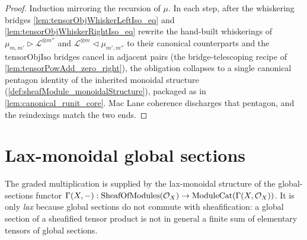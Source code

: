 \begin{proof}
  Induction mirroring the recursion of \(\mu\). In each step, after the whiskering
  bridges \cref{lem:tensorObjWhiskerLeftIso_eq} and
  \cref{lem:tensorObjWhiskerRightIso_eq} rewrite the hand-built whiskerings of
  \(\mu_{m,m'} \rhd \mathcal{L}^{\otimes m''}\) and
  \(\mathcal{L}^{\otimes m} \lhd \mu_{m',m''}\) to their canonical counterparts and
  the \(\mathrm{tensorObjIso}\) bridges cancel in adjacent pairs (the
  bridge-telescoping recipe of \cref{lem:tensorPowAdd_zero_right}), the obligation
  collapses to a single canonical pentagon identity of the inherited monoidal
  structure (\cref{def:sheafModule_monoidalStructure}), packaged as in
  \cref{lem:canonical_runit_core}. Mac Lane coherence discharges that pentagon, and
  the reindexings match the two ends.
\end{proof}

\section{Lax-monoidal global sections}
\label{sec:sgr_lax_sections}

The graded multiplication is supplied by the lax-monoidal structure of the
global-sections functor \(\Gamma(X, -) : \mathrm{SheafOfModules}(\mathcal{O}_X) \to
\mathrm{ModuleCat}(\Gamma(X, \mathcal{O}_X))\). It is only \emph{lax} because
global sections do not commute with sheafification: a global section of a
sheafified tensor product is not in general a finite sum of elementary tensors of
global sections.

